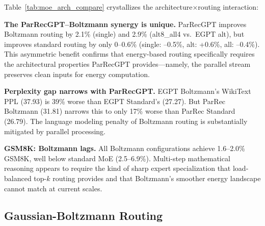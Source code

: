 \documentclass[oneside]{article}
\begin{document}
Table~\ref{tab:moe_arch_compare} crystallizes the architecture$\times$routing interaction:

\textbf{The ParRecGPT--Boltzmann synergy is unique.} ParRecGPT improves Boltzmann routing by 2.1\% (single) and 2.9\% (alt8\_all4 vs.\ EGPT alt), but improves standard routing by only 0--0.6\% (single: --0.5\%, alt: +0.6\%, all: --0.4\%). This asymmetric benefit confirms that energy-based routing specifically requires the architectural properties ParRecGPT provides---namely, the parallel stream preserves clean inputs for energy computation.

\textbf{Perplexity gap narrows with ParRecGPT.} EGPT Boltzmann's WikiText PPL (37.93) is 39\% worse than EGPT Standard's (27.27). But ParRec Boltzmann (31.81) narrows this to only 17\% worse than ParRec Standard (26.79). The language modeling penalty of Boltzmann routing is substantially mitigated by parallel processing.

\textbf{GSM8K: Boltzmann lags.} All Boltzmann configurations achieve 1.6--2.0\% GSM8K, well below standard MoE (2.5--6.9\%). Multi-step mathematical reasoning appears to require the kind of sharp expert specialization that load-balanced top-$k$ routing provides and that Boltzmann's smoother energy landscape cannot match at current scales.


\subsection{Gaussian-Boltzmann Routing}
\label{sec:gaussboltz}
\end{document}
